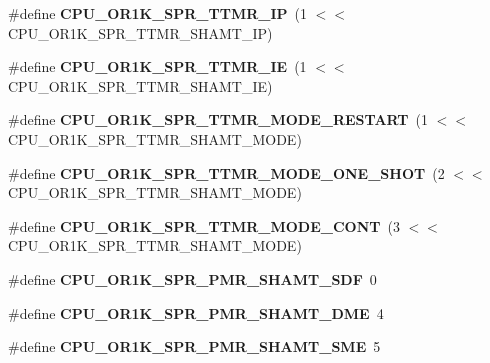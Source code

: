 \begin{DoxyCompactItemize}
\#define {\bfseries C\+P\+U\+\_\+\+O\+R1\+K\+\_\+\+S\+P\+R\+\_\+\+T\+T\+M\+R\+\_\+\+IP}~(1 $<$$<$ C\+P\+U\+\_\+\+O\+R1\+K\+\_\+\+S\+P\+R\+\_\+\+T\+T\+M\+R\+\_\+\+S\+H\+A\+M\+T\+\_\+\+IP)
\item 
\mbox{\label{or1k-utility_8h_aea2bf44d082224743e545d9ab026045b}} 
\#define {\bfseries C\+P\+U\+\_\+\+O\+R1\+K\+\_\+\+S\+P\+R\+\_\+\+T\+T\+M\+R\+\_\+\+IE}~(1 $<$$<$ C\+P\+U\+\_\+\+O\+R1\+K\+\_\+\+S\+P\+R\+\_\+\+T\+T\+M\+R\+\_\+\+S\+H\+A\+M\+T\+\_\+\+IE)
\item 
\mbox{\label{or1k-utility_8h_a8279d75f56478dd43ea95bf8496fe4a8}} 
\#define {\bfseries C\+P\+U\+\_\+\+O\+R1\+K\+\_\+\+S\+P\+R\+\_\+\+T\+T\+M\+R\+\_\+\+M\+O\+D\+E\+\_\+\+R\+E\+S\+T\+A\+RT}~(1 $<$$<$ C\+P\+U\+\_\+\+O\+R1\+K\+\_\+\+S\+P\+R\+\_\+\+T\+T\+M\+R\+\_\+\+S\+H\+A\+M\+T\+\_\+\+M\+O\+DE)
\item 
\mbox{\label{or1k-utility_8h_af37d16bd51994be0501b175f98167227}} 
\#define {\bfseries C\+P\+U\+\_\+\+O\+R1\+K\+\_\+\+S\+P\+R\+\_\+\+T\+T\+M\+R\+\_\+\+M\+O\+D\+E\+\_\+\+O\+N\+E\+\_\+\+S\+H\+OT}~(2 $<$$<$ C\+P\+U\+\_\+\+O\+R1\+K\+\_\+\+S\+P\+R\+\_\+\+T\+T\+M\+R\+\_\+\+S\+H\+A\+M\+T\+\_\+\+M\+O\+DE)
\item 
\mbox{\label{or1k-utility_8h_afb41877378d8d2bec33b6632644c39b4}} 
\#define {\bfseries C\+P\+U\+\_\+\+O\+R1\+K\+\_\+\+S\+P\+R\+\_\+\+T\+T\+M\+R\+\_\+\+M\+O\+D\+E\+\_\+\+C\+O\+NT}~(3 $<$$<$ C\+P\+U\+\_\+\+O\+R1\+K\+\_\+\+S\+P\+R\+\_\+\+T\+T\+M\+R\+\_\+\+S\+H\+A\+M\+T\+\_\+\+M\+O\+DE)
\item 
\mbox{\label{or1k-utility_8h_a9983e35d82069a95e381e4a1ffa4b085}} 
\#define {\bfseries C\+P\+U\+\_\+\+O\+R1\+K\+\_\+\+S\+P\+R\+\_\+\+P\+M\+R\+\_\+\+S\+H\+A\+M\+T\+\_\+\+S\+DF}~0
\item 
\mbox{\label{or1k-utility_8h_a324db8bb68f999932ccbf8ed77cbd89f}} 
\#define {\bfseries C\+P\+U\+\_\+\+O\+R1\+K\+\_\+\+S\+P\+R\+\_\+\+P\+M\+R\+\_\+\+S\+H\+A\+M\+T\+\_\+\+D\+ME}~4
\item 
\mbox{\label{or1k-utility_8h_aa28ad14c450660f66335f7bd9632e369}} 
\#define {\bfseries C\+P\+U\+\_\+\+O\+R1\+K\+\_\+\+S\+P\+R\+\_\+\+P\+M\+R\+\_\+\+S\+H\+A\+M\+T\+\_\+\+S\+ME}~5
$$
\end{DoxyCompactItemize}
